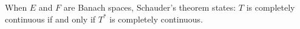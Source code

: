 When $E$ and $F$ are Banach spaces, Schauder's theorem states: $T$ is completely continuous if and only if $T^{*}$ is completely continuous.
